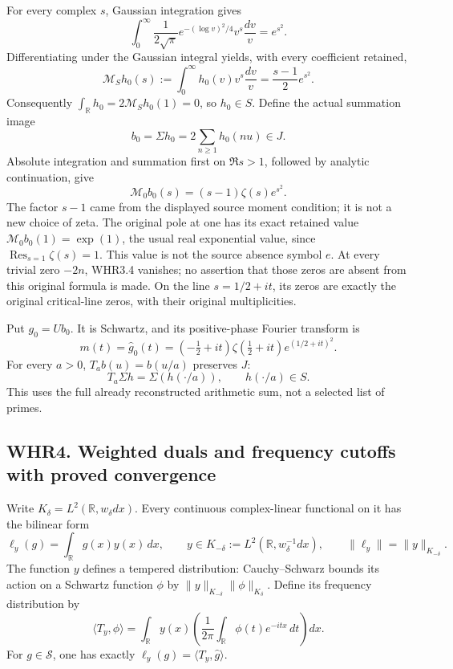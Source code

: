 For every complex \(s\), Gaussian integration gives \[
 \int_0^\infty\frac1{2\sqrt\pi}
 e^{-(\log v)^2/4}v^s\frac{dv}{v}=e^{s^2}.
\] Differentiating under the Gaussian integral yields, with every
coefficient retained, \[
 \mathcal M_Sh_0(s)
 :=\int_0^\infty h_0(v)v^s\frac{dv}{v}
 =\frac{s-1}{2}e^{s^2}.
 \tag{WHR3.2}
\] Consequently \(\int_{\mathbb R}h_0=2\mathcal M_Sh_0(1)=0\), so
\(h_0\in S\). Define the actual summation image \[
 b_0=\Sigma h_0=2\sum_{n\geq1}h_0(nu)\in J.
 \tag{WHR3.3}
\] Absolute integration and summation first on \(\Re s>1\), followed by
analytic continuation, give \[
 \boxed{\mathcal M_0b_0(s)=(s-1)\zeta(s)e^{s^2}.}
 \tag{WHR3.4}
\] The factor \(s-1\) came from the displayed source moment condition;
it is not a new choice of zeta. The original pole at one has its exact
retained value \(\mathcal M_0b_0(1)=\exp(1)\), the usual real
exponential value, since \(\operatorname{Res}_{s=1}\zeta(s)=1\). This
value is not the source absence symbol \(e\). At every trivial zero
\(-2n\), WHR3.4 vanishes; no assertion that those zeros are absent from
this original formula is made. On the line \(s=1/2+it\), its zeros are
exactly the original critical-line zeros, with their original
multiplicities.

Put \(g_0=Ub_0\). It is Schwartz, and its positive-phase Fourier
transform is \[
 m(t)=\widehat g_0(t)
 =(-\tfrac12+it)\zeta(\tfrac12+it)e^{(1/2+it)^2}.
 \tag{WHR3.5}
\] For every \(a>0\), \(T_ab(u)=b(u/a)\) preserves \(J\): \[
 T_a\Sigma h=\Sigma(h(\cdot/a)),\qquad h(\cdot/a)\in S.
 \tag{WHR3.6}
\] This uses the full already reconstructed arithmetic sum, not a
selected list of primes.

\subsection{WHR4. Weighted duals and frequency cutoffs with proved
convergence}\label{whr4.-weighted-duals-and-frequency-cutoffs-with-proved-convergence}

Write \(K_\delta=L^2(\mathbb R,w_\delta dx)\). Every continuous
complex-linear functional on it has the bilinear form \[
 \ell_y(g)=\int_{\mathbb R}g(x)y(x)\,dx,
 \qquad y\in K_{-\delta}:=L^2(\mathbb R,w_\delta^{-1}dx),
 \qquad \|\ell_y\|=\|y\|_{K_{-\delta}}.
 \tag{WHR4.1}
\] The function \(y\) defines a tempered distribution: Cauchy--Schwarz
bounds its action on a Schwartz function \(\phi\) by
\(\|y\|_{K_{-\delta}}\|\phi\|_{K_\delta}\). Define its frequency
distribution by \[
 \langle T_y,\phi\rangle
 =\int_{\mathbb R}y(x)\left(\frac1{2\pi}
                  \int_{\mathbb R}\phi(t)e^{-itx}\,dt\right)dx.
 \tag{WHR4.2}
\] For \(g\in\mathcal S\), one has exactly
\(\ell_y(g)=\langle T_y,\widehat g\rangle\).

